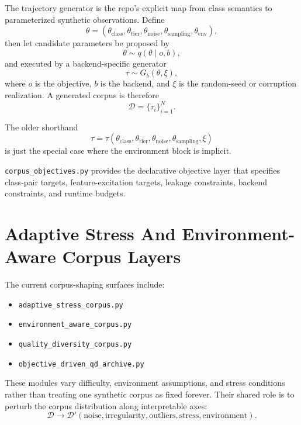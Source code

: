 \documentclass[11pt]{article}
\begin{document}
The trajectory generator is the repo's explicit map from class semantics to
parameterized synthetic observations. Define
\begin{equation}
    \theta =
    (\theta_{\text{class}}, \theta_{\text{tier}}, \theta_{\text{noise}}, \theta_{\text{sampling}}, \theta_{\text{env}}),
\end{equation}
then let candidate parameters be proposed by
\begin{equation}
    \theta \sim q(\theta \mid o, b),
\end{equation}
and executed by a backend-specific generator
\begin{equation}
    \tau \sim G_b(\theta, \xi),
\end{equation}
where \(o\) is the objective, \(b\) is the backend, and \(\xi\) is the
random-seed or corruption realization. A generated corpus is therefore
\begin{equation}
    \mathcal{D} = \{\tau_i\}_{i=1}^{N}.
\end{equation}

The older shorthand
\begin{equation}
    \tau = \tau(\theta_{\text{class}}, \theta_{\text{tier}}, \theta_{\text{noise}}, \theta_{\text{sampling}}, \xi)
\end{equation}
is just the special case where the environment block is implicit.

\texttt{corpus\_objectives.py} provides the declarative objective layer that
specifies class-pair targets, feature-excitation targets, leakage constraints,
backend constraints, and runtime budgets.

\section{Adaptive Stress And Environment-Aware Corpus Layers}

The current corpus-shaping surfaces include:
\begin{itemize}[leftmargin=1.5em]
    \item \texttt{adaptive\_stress\_corpus.py}
    \item \texttt{environment\_aware\_corpus.py}
    \item \texttt{quality\_diversity\_corpus.py}
    \item \texttt{objective\_driven\_qd\_archive.py}
\end{itemize}

These modules vary difficulty, environment assumptions, and stress conditions
rather than treating one synthetic corpus as fixed forever. Their shared role is
to perturb the corpus distribution along interpretable axes:
\begin{equation}
    \mathcal{D}
    \rightarrow
    \mathcal{D}'(\text{noise}, \text{irregularity}, \text{outliers}, \text{stress}, \text{environment}).
\end{equation}
\end{document}
